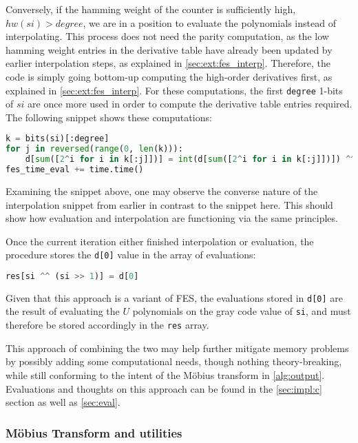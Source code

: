 Conversely, if the hamming weight of the counter is sufficiently high, $hw(si) > degree$, we are in a position to evaluate the polynomials instead of interpolating. This process does not need the parity computation, as the low hamming weight entries in the derivative table have already been updated by earlier interpolation steps, as explained in \cref{sec:ext:fes_interp}. Therefore, the code is simply going bottom-up computing the high-order derivatives first, as explained in \cref{sec:ext:fes_interp}. For these computations, the first \texttt{degree} 1-bits of $si$ are once more used in order to compute the derivative table entries required. The following snippet shows these computations:
\begin{lstlisting}[language=Python,style=mystyle]
k = bits(si)[:degree]
for j in reversed(range(0, len(k))):
    d[sum([2^i for i in k[:j]])] = int(d[sum([2^i for i in k[:j]])]) ^^ int(d[sum([2^i for i in k[:j+1]])])
fes_time_eval += time.time()
\end{lstlisting}
Examining the snippet above, one may observe the converse nature of the interpolation snippet from earlier in contrast to the snippet here. This should show how evaluation and interpolation are functioning via the same principles.

Once the current iteration either finished interpolation or evaluation, the procedure stores the \texttt{d[0]} value in the array of evaluations:
\begin{lstlisting}[language=Python,style=mystyle]
res[si ^^ (si >> 1)] = d[0]
\end{lstlisting}
Given that this approach is a variant of FES, the evaluations stored in \texttt{d[0]} are the result of evaluating the $U$ polynomials on the gray code value of \texttt{si}, and must therefore be stored accordingly in the \texttt{res} array.

This approach of combining the two may help further mitigate memory problems by possibly adding some computational needs, though nothing theory-breaking, while still conforming to the intent of the Möbius transform in \cref{alg:output}. Evaluations and thoughts on this approach can be found in the \cref{sec:impl:c} section as well as \cref{sec:eval}.

\subsubsection{Möbius Transform and utilities}

